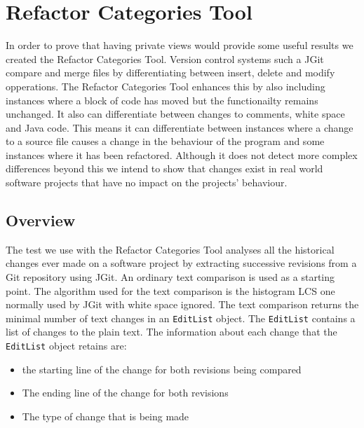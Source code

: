 
\chapter{Refactor Categories Tool}
In order to prove that having private views would provide some useful results we created the Refactor Categories Tool. Version control systems such a JGit compare and merge files  by differentiating between insert, delete and modify  opperations. The Refactor Categories Tool enhances this by also including instances where a block of code has moved but the functionailty remains unchanged. It also can differentiate between changes to comments, white space and Java code. This means it can differentiate between instances where a change to a source file causes a change in the behaviour of the program and some instances where it has been refactored.  Although it does not detect more complex differences beyond this we intend to show that changes exist in real world software projects that have no impact on the projects' behaviour.



\section{Overview}
The test we use with the Refactor Categories Tool analyses all the historical changes ever made on a software project by extracting successive revisions from a Git repository using JGit.
An ordinary text comparison is used as a starting point.  The algorithm used for the text comparison is the histogram LCS one normally used by JGit with white space ignored. The text comparison returns the minimal number of text changes in an \lstinline{EditList} object.  The \lstinline{EditList} contains a list of changes to the plain text. The information about each change that the \lstinline{EditList} object retains are:

\begin{itemize}
  \item the starting line of the change for both revisions being compared
  \item The ending line of the change for both revisions 
  \item The type of change that is being made
\end{itemize}

